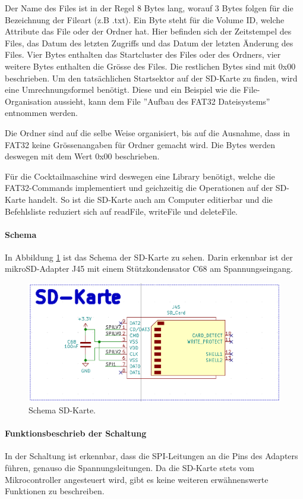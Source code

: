 Der Name des Files ist in der Regel 8 Bytes lang, worauf 3 Bytes folgen für die Bezeichnung der Fileart (z.B .txt). Ein Byte steht für die Volume ID, welche Attribute das File oder der Ordner hat. Hier befinden sich der Zeitstempel des Files, das Datum des letzten Zugriffs und das Datum der letzten Änderung des Files. Vier Bytes enthalten das Startcluster des Files oder des Ordners, vier weitere Bytes enthalten die Grösse des Files. Die restlichen Bytes sind mit 0x00 beschrieben. Um den tatsächlichen Startsektor auf der SD-Karte zu finden, wird eine Umrechnungsformel benötigt. Diese und ein Beispiel wie die File-Organisation aussieht, kann dem File ''Aufbau des FAT32 Dateisystems'' entnommen werden.


Die Ordner sind auf die selbe Weise organisiert, bis auf die Ausnahme, dass in FAT32 keine Grössenangaben für Ordner gemacht wird. Die Bytes werden deswegen mit dem Wert 0x00 beschrieben.

Für die Cocktailmaschine wird deswegen eine Library benötigt, welche die FAT32-Commands implementiert und geichzeitig die Operationen auf der SD-Karte handelt. So ist die SD-Karte auch am Computer editierbar und die Befehlsliste reduziert sich auf readFile, writeFile und deleteFile.

\paragraph{Schema}\mbox{}

In Abbildung \ref{fig:Schema_SD_Karte} ist das Schema der SD-Karte zu sehen. Darin erkennbar ist der mikroSD-Adapter J45 mit einem Stützkondensator C68 am Spannungseingang.

\begin{figure}[!h]
\center
\includegraphics[width = 0.6 \textwidth]{graphics/Schema_SD_Karte}
\caption{Schema SD-Karte.}
\label{fig:Schema_SD_Karte}
\end{figure}

\paragraph{Funktionsbeschrieb der Schaltung}\mbox{}

In der Schaltung ist erkennbar, dass die SPI-Leitungen an die Pins des Adapters führen, genauso die Spannungsleitungen. Da die SD-Karte stets vom Mikrocontroller angesteuert wird, gibt es keine weiteren erwähnenswerte Funktionen zu beschreiben.
